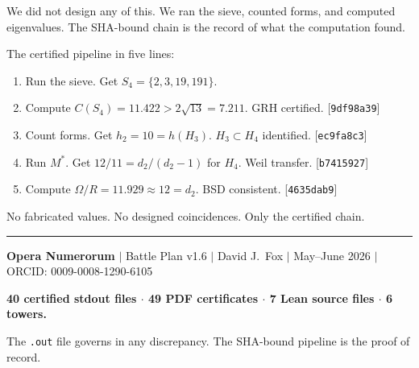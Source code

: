 \documentclass[12pt,letterpaper]{article}
\begin{document}
We did not design any of this.
We ran the sieve, counted forms, and computed eigenvalues.
The SHA-bound chain is the record of what the computation found.

\medskip
\noindent The certified pipeline in five lines:
\begin{enumerate}
  \item Run the sieve. Get $S_4 = \{2,3,19,191\}$.
  \item Compute $C(S_4) = 11.422 > 2\sqrt{13} = 7.211$. GRH certified.
    \hfill [\texttt{9df98a39}]
  \item Count forms. Get $h_2 = 10 = h(H_3)$. $H_3 \subset H_4$ identified.
    \hfill [\texttt{ec9fa8c3}]
  \item Run $M^*$. Get $12/11 = d_2/(d_2-1)$ for $H_4$. Weil transfer.
    \hfill [\texttt{b7415927}]
  \item Compute $\Omega/R = 11.929 \approx 12 = d_2$. BSD consistent.
    \hfill [\texttt{4635dab9}]
\end{enumerate}

\bigskip
\noindent No fabricated values. No designed coincidences.
Only the certified chain.


\vspace{2em}
\noindent\rule{\linewidth}{0.4pt}

\noindent\textbf{Opera Numerorum} $|$ Battle Plan v1.6 $|$
David J.\ Fox $|$ May--June 2026 $|$
ORCID: 0009-0008-1290-6105

\noindent\textbf{40 certified stdout files $\cdot$
49 PDF certificates $\cdot$
7 Lean source files $\cdot$
6 towers.}

\noindent The \texttt{.out} file governs in any discrepancy.
The SHA-bound pipeline is the proof of record.
\end{document}
